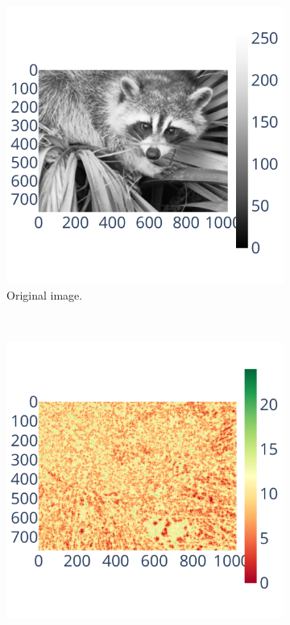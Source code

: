 \begin{figure}
    \centering
    \begin{subfigure}{.3\linewidth}
        \includegraphics[width=\linewidth]{figure/bspline/original_image.pdf}
        \caption{Original image.}
        \label{fig:bspline_original_image}
    \end{subfigure}\\
    \begin{subfigure}{0.3\linewidth}
        \includegraphics[width=\linewidth]{figure/bspline/bspline_sig.pdf}

\end{subfigure}
\end{figure}
